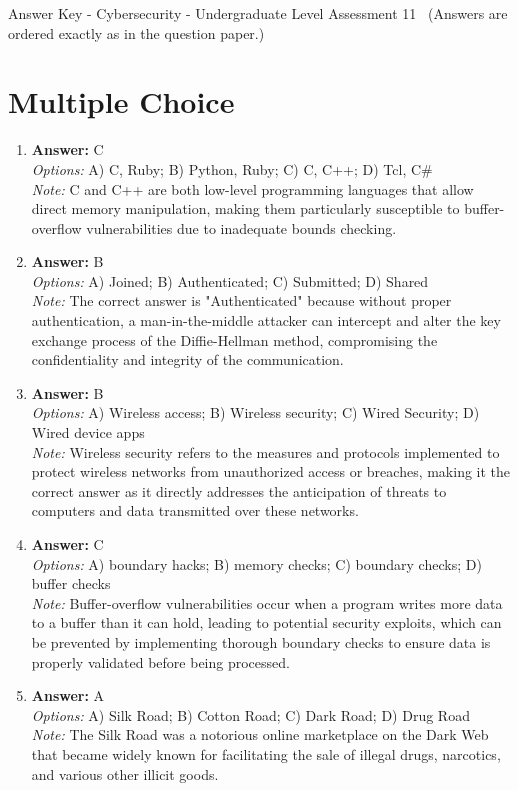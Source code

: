 \documentclass[12pt]{article}
\begin{document}
\begin{center}
Answer Key - Cybersecurity - Undergraduate Level Assessment 11 \
\small (Answers are ordered exactly as in the question paper.)
\end{center}

\section*{Multiple Choice}
\begin{enumerate}[label=\arabic*.]
\item \textbf{Answer:} C
\\ \textit{Options:} A) C, Ruby; B) Python, Ruby; C) C, C++; D) Tcl, C\#
\\ \textit{Note:} C and C++ are both low-level programming languages that allow direct memory manipulation, making them particularly susceptible to buffer-overflow vulnerabilities due to inadequate bounds checking.
\item \textbf{Answer:} B
\\ \textit{Options:} A) Joined; B) Authenticated; C) Submitted; D) Shared
\\ \textit{Note:} The correct answer is "Authenticated" because without proper authentication, a man-in-the-middle attacker can intercept and alter the key exchange process of the Diffie-Hellman method, compromising the confidentiality and integrity of the communication.
\item \textbf{Answer:} B
\\ \textit{Options:} A) Wireless access; B) Wireless security; C) Wired Security; D) Wired device apps
\\ \textit{Note:} Wireless security refers to the measures and protocols implemented to protect wireless networks from unauthorized access or breaches, making it the correct answer as it directly addresses the anticipation of threats to computers and data transmitted over these networks.
\item \textbf{Answer:} C
\\ \textit{Options:} A) boundary hacks; B) memory checks; C) boundary checks; D) buffer checks
\\ \textit{Note:} Buffer-overflow vulnerabilities occur when a program writes more data to a buffer than it can hold, leading to potential security exploits, which can be prevented by implementing thorough boundary checks to ensure data is properly validated before being processed.
\item \textbf{Answer:} A
\\ \textit{Options:} A) Silk Road; B) Cotton Road; C) Dark Road; D) Drug Road
\\ \textit{Note:} The Silk Road was a notorious online marketplace on the Dark Web that became widely known for facilitating the sale of illegal drugs, narcotics, and various other illicit goods.
\end{enumerate}
\end{document}
